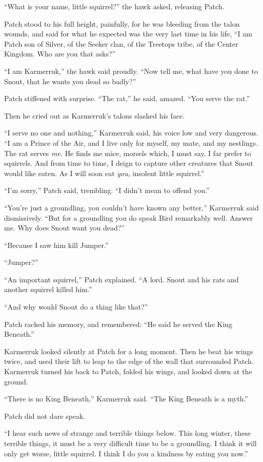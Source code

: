 \documentclass[ebook,oneside,openany,12pt]{memoir}
\begin{document}
“What is your name, little squirrel?” the hawk asked, releasing Patch.

Patch stood to his full height, painfully, for he was bleeding from
the talon wounds, and said for what he expected was the very last time
in his life, “I am Patch son of Silver, of the Seeker clan, of the
Treetops tribe, of the Center Kingdom. Who are you that asks?”

“I am Karmerruk,” the hawk said proudly. “Now tell me, what have you
done to Snout, that he wants you dead so badly?”

Patch stiffened with surprise. “The rat,” he said, amazed. “You serve
the rat.”

Then he cried out as Karmerruk’s talons slashed his face.

“I serve no one and nothing,” Karmerruk said, his voice low and very
dangerous. “I am a Prince of the Air, and I live only for myself, my
mate, and my nestlings. The rat serves \emph{me.} He finds me mice,
morsels which, I must say, I far prefer to squirrels. And from time to
time, I deign to capture other creatures that Snout would like
eaten. As I will soon eat \emph{you,} insolent little squirrel.”

“I’m sorry,” Patch said, trembling. “I didn’t mean to offend you.”

“You’re just a groundling, you couldn’t have known any better,”
Karmerruk said dismissively. “But for a groundling you do speak Bird
remarkably well. Answer me. Why does Snout want you dead?”

“Because I saw him kill Jumper.”

“Jumper?”

“An important squirrel,” Patch explained. “A lord. Snout and his rats
and another squirrel killed him.”

“And why would Snout do a thing like that?”

Patch racked his memory, and remembered: “He said he served the King
Beneath.”

Karmerruk looked silently at Patch for a long moment. Then he beat his
wings twice, and used their lift to leap to the edge of the wall that
surrounded Patch. Karmerruk turned his back to Patch, folded his
wings, and looked down at the ground.

“There is no King Beneath,” Karmerruk said. “The King Beneath is a
myth.”

Patch did not dare speak.

“I hear such news of strange and terrible things below. This long
winter, these terrible things, it must be a very difficult time to be
a groundling. I think it will only get worse, little squirrel. I think
I do you a kindness by eating you now.”
\end{document}
